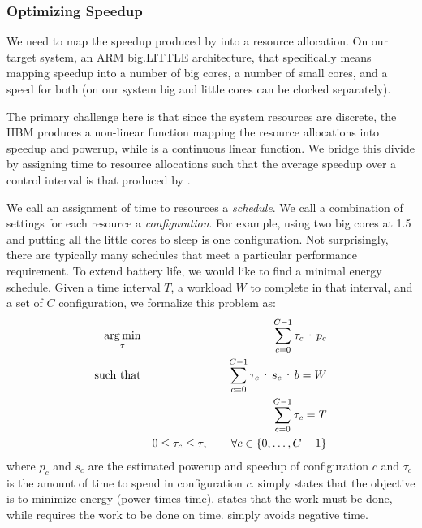 \subsubsection{Optimizing Speedup}
We need to map the speedup produced by  into a
resource allocation.  On our target system, an ARM big.LITTLE
architecture, that specifically means mapping speedup into a number of
big cores, a number of small cores, and a speed for both (on our
system big and little cores can be clocked separately).

The primary challenge here is that since the system resources are discrete, the HBM produces a non-linear
function mapping the resource allocations into speedup and
powerup, while  is a continuous linear
function.  We bridge this divide by assigning time to resource
allocations such that the average speedup over a control interval is
that produced by .

We call an assignment of time to resources a \emph{schedule}. We call
a combination of settings for each resource a \emph{configuration}.  For
example, using two big cores at 1.5 \GHz and putting all the little
cores to sleep is one configuration.  Not surprisingly, there are
typically many schedules that meet a particular performance
requirement.  To extend battery life, we would like to find a minimal
energy schedule. Given a time interval $T$, a workload $W$ to
complete in that interval, and a set of $C$ configuration, we
formalize this problem as:
\begin{eqnarray}
  \argmin_{\tau} && \sum_{c=0}^{C-1} \tau_c \cdot p_c \label{eqn:power} \\
  \text{such that} %
  && \sum_{c=0}^{C-1} \tau_c \cdot s_c \cdot b =  W \label{eqn:work} \\
  && \sum_{c=0}^{C-1} \tau_c =  T \label{eqn:deadline} \\
  && 0 \le \tau_c \le \tau, \qquad \forall c \in \{0,\ldots,C-1\} \label{eqn:time}
\end{eqnarray}
where $p_c$ and $s_c$ are the estimated powerup and speedup of
configuration $c$ and $\tau_c$ is the amount of time to spend in
configuration $c$.   simply states that the objective is
to minimize energy (power times time).   states that the
work must be done, while  requires the work to be
done on time.   simply avoids negative time.  


